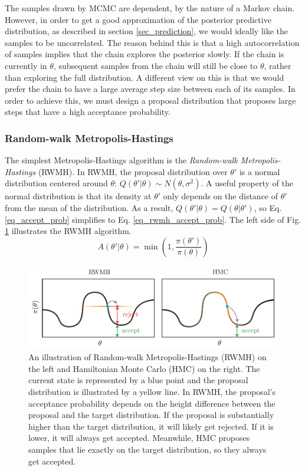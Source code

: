 \documentclass[12pt]{article}
\begin{document}
The samples drawn by MCMC are dependent, by the nature of a Markov chain. However, in order to get a good approximation of the posterior predictive distribution, as described in section \ref{sec_prediction}, we would ideally like the samples to be uncorrelated. The reason behind this is that a high autocorrelation of samples implies that the chain explores the posterior slowly. If the chain is currently in $\theta$, subsequent samples from the chain will still be close to $\theta$, rather than exploring the full distribution. A different view on this is that we would prefer the chain to have a large average step size between each of its samples. In order to achieve this, we must design a proposal distribution that proposes large steps that have a high acceptance probability.

\subsubsection{Random-walk Metropolis-Hastings}

The simplest Metropolis-Hastings algorithm is the \textit{Random-walk Metropolis-Hastings} (RWMH). In RWMH, the proposal distribution over $\theta'$ is a normal distribution centered around $\theta$: $Q(\theta'|\theta) \sim N(\theta, \sigma^2)$. A useful property of the normal distribution is that its density at $\theta'$ only depends on the distance of $\theta'$ from the mean of the distribution. As a result, $Q(\theta'|\theta) = Q(\theta|\theta')$, so Eq. \ref{eq_accept_prob} simplifies to Eq. \ref{eq_rwmh_accept_prob}. The left side of Fig. \ref{fig_rwmh_vs_hmc} illustrates the RWMH algorithm.
\begin{equation}
A(\theta'|\theta) = \min \left(1, \frac{\pi(\theta')}{\pi(\theta)} \right)
\label{eq_rwmh_accept_prob}
\end{equation}

\begin{figure}[H]
\centering
\includegraphics[width=14cm]{illustrations/rwmh_vs_hmc.pdf}
\caption{An illustration of Random-walk Metropolis-Hastings (RWMH) on the left and Hamiltonian Monte Carlo (HMC) on the right. The current state is represented by a blue point and the proposal distribution is illustrated by a yellow line. In RWMH, the proposal's acceptance probability depends on the height difference between the proposal and the target distribution. If the proposal is substantially higher than the target distribution, it will likely get rejected. If it is lower, it will always get accepted. Meanwhile, HMC proposes samples that lie exactly on the target distribution, so they always get accepted.}
\label{fig_rwmh_vs_hmc}
\end{figure}
\end{document}
